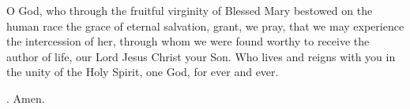 \lettrine[lines=3]{O}{} God, who through the fruitful virginity of Blessed Mary
bestowed on the human race
the grace of eternal salvation,
grant, we pray,
that we may experience the intercession of her,
through whom we were found worthy
to receive the author of life,
our Lord Jesus Christ your Son.
Who lives and reigns with you in the unity of the Holy Spirit,
one God, for ever and ever. \par \Rbar. Amen. 
